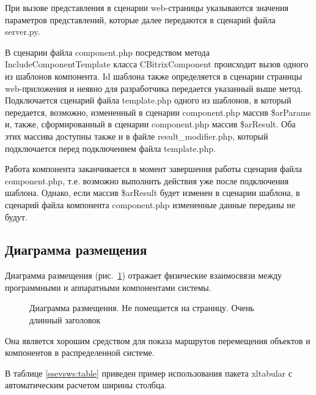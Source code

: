 При вызове представления в сценарии web-страницы указываются значения параметров представлений, которые далее передаются в сценарий файла server.py.

В сценарии файла component.php посредством метода \linebreak IncludeComponentTemplate класса CBitrixComponent происходит вызов одного из шаблонов компонента. Id шаблона также определяется в сценарии страницы web-приложения и неявно для разработчика передается указанный выше метод. Подключается сценарий файла template.php одного из шаблонов, в который передается, возможно, измененный в сценарии component.php массив \$arParams и, также, сформированный в сценарии component.php массив \$arResult. Оба этих массива доступны также и в файле result\_modifier.php, который подключается перед подключением файла template.php. 

Работа компонента заканчивается в момент завершения работы сценария файла component.php, т.е. возможно выполнить действия уже после подключения шаблона. Однако, если массив \$arResult будет изменен в сценарии шаблона, в сценарий файла компонента component.php измененные данные переданы не будут.

\subsection{Диаграмма размещения}

Диаграмма размещения (рис.~\ref{place:image}) отражает физические взаимосвязи между программными и аппаратными компонентами системы.

\vspace{-8mm} %
\begin{figure}[ht]
\caption{Диаграмма размещения. Не помещается на страницу. Очень длинный заголовок}
\label{place:image}
\end{figure}

Она является хорошим средством для показа маршрутов перемещения объектов и компонентов в распределенной системе.

В таблице \ref{ssevsws:table} приведен пример использования пакета xltabular с автоматическим расчетом ширины столбца.

